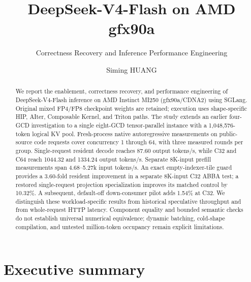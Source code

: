 \documentclass[sigplan,10pt]{acmart}
\newcommand{\metric}[1]{#1}
\begin{document}
\title[DeepSeek-V4-Flash on AMD gfx90a]{DeepSeek-V4-Flash on AMD gfx90a}
\subtitle{Correctness Recovery and Inference Performance Engineering}
\author{Siming HUANG}

\begin{abstract}
We report the enablement, correctness recovery, and performance engineering of DeepSeek-V4-Flash inference on AMD Instinct MI250 (gfx90a/CDNA2) using SGLang. Original mixed FP4/FP8 checkpoint weights are retained; execution uses shape-specific HIP, AIter, Composable Kernel, and Triton paths. The study extends an earlier four-GCD investigation to a single eight-GCD tensor-parallel instance with a 1,048,576-token logical KV pool. Fresh-process native autoregressive measurements on public-source code requests cover concurrency 1 through 64, with three measured rounds per group. Single-request resident decode reaches \metric{87.60 output tokens/s}, while C32 and C64 reach \metric{1044.32} and \metric{1334.24 output tokens/s}. Separate 8K-input prefill measurements span \metric{4.68--5.27k input tokens/s}. An exact empty-indexer-tile guard provides a 3.60-fold resident improvement in a separate 8K-input C32 ABBA test; a restored single-request projection specialization improves its matched control by 10.32\%. A subsequent, default-off down-consumer pilot adds 1.54\% at C32. We distinguish these workload-specific results from historical speculative throughput and from whole-request HTTP latency. Component equality and bounded semantic checks do not establish universal numerical equivalence; dynamic batching, cold-shape compilation, and untested million-token occupancy remain explicit limitations.
\end{abstract}

\maketitle
{}

\section{Executive summary}
\end{document}
